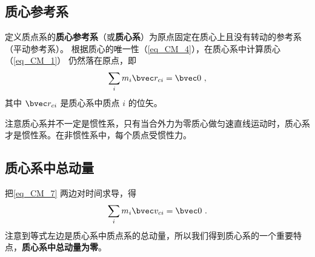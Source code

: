 \subsection{质心参考系}
定义质点系的\textbf{质心参考系}（或\textbf{质心系}）为原点固定在质心上且没有转动的参考系（平动参考系）。%
根据质心的唯一性（\autoref{eq_CM_4}），在质心系中计算质心（\autoref{eq_CM_1}） 仍然落在原点，即
\begin{equation}\label{eq_CM_7}
\sum_i m_i \bvec r_{ci} = \bvec 0~,
\end{equation}
其中 $\bvec r_{ci}$ 是质心系中质点 $i$ 的位矢。

注意质心系并不一定是惯性系，只有当合外力为零质心做匀速直线运动时，质心系才是惯性系。在非惯性系中，每个质点受惯性力。

\subsection{质心系中总动量}
把\autoref{eq_CM_7} 两边对时间求导，得
\begin{equation}\label{eq_CM_8}
\sum_i m_i \bvec v_{ci} = \bvec 0~.
\end{equation}
注意到等式左边是质心系中质点系的总动量，所以我们得到质心系的一个重要特点，\textbf{质心系中总动量为零}。
